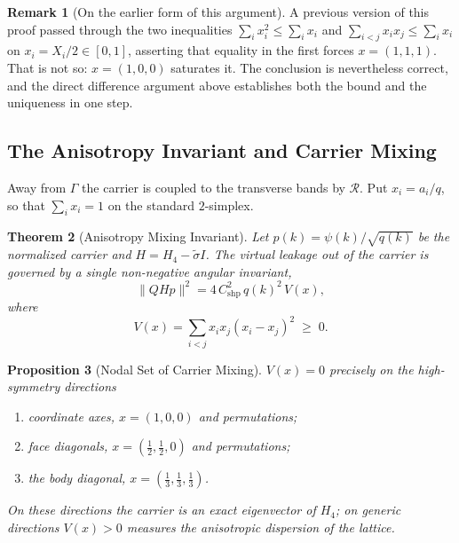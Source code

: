 \documentclass[11pt,a4paper]{article}
\newtheorem{theorem}{Theorem}[section]
\newtheorem{proposition}[theorem]{Proposition}
\theoremstyle{definition}
\newtheorem{remark}[theorem]{Remark}
\newcommand{\Rc}{\mathcal{R}}          %
\newcommand{\Cshp}{C_{\mathrm{shp}}}
\begin{document}
\begin{remark}[On the earlier form of this argument]\label{rem:max_fix}
A previous version of this proof passed through the two inequalities $\sum_i x_i^2 \le \sum_i x_i$ and $\sum_{i<j}x_ix_j \le \sum_i x_i$ on $x_i = X_i/2 \in [0,1]$, asserting that equality in the first forces $x = (1,1,1)$. That is not so: $x = (1,0,0)$ saturates it. The conclusion is nevertheless correct, and the direct difference argument above establishes both the bound and the uniqueness in one step.
\end{remark}

\subsection{The Anisotropy Invariant and Carrier Mixing}

Away from $\Gamma$ the carrier is coupled to the transverse bands by $\Rc$. Put $x_i = a_i/q$, so that $\sum_i x_i = 1$ on the standard $2$-simplex.

\begin{theorem}[Anisotropy Mixing Invariant]\label{thm:anisotropy_mixing}
Let $p(k) = \psi(k)/\sqrt{q(k)}$ be the normalized carrier and $H = H_4 - \tilde\sigma I$. The virtual leakage out of the carrier is governed by a single non-negative angular invariant,
\begin{equation}\label{eq:mixing_norm}
  \|Q H p\|^2 = 4\,\Cshp^2\,q(k)^2\,V(x),
\end{equation}
where
\begin{equation}\label{eq:Vx_def}
  V(x) = \sum_{i<j}x_ix_j(x_i-x_j)^2 \;\ge\; 0 .
\end{equation}
\end{theorem}

\begin{proposition}[Nodal Set of Carrier Mixing]\label{prop:nodal_set}
$V(x) = 0$ precisely on the high-symmetry directions
\begin{enumerate}\itemsep1pt
  \item coordinate axes, $x = (1,0,0)$ and permutations;
  \item face diagonals, $x = (\tfrac12,\tfrac12,0)$ and permutations;
  \item the body diagonal, $x = (\tfrac13,\tfrac13,\tfrac13)$.
\end{enumerate}
On these directions the carrier is an exact eigenvector of $H_4$; on generic directions $V(x)>0$ measures the anisotropic dispersion of the lattice.
\end{proposition}
\end{document}
